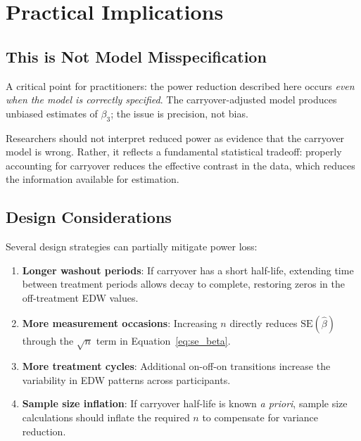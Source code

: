\documentclass[11pt,letterpaper]{article}
\begin{document}
\section{Practical Implications}

\subsection{This is Not Model Misspecification}

A critical point for practitioners: the power reduction described here occurs
\emph{even when the model is correctly specified}. The carryover-adjusted
model produces unbiased estimates of $\beta_3$; the issue is precision, not
bias.

Researchers should not interpret reduced power as evidence that the carryover
model is wrong. Rather, it reflects a fundamental statistical tradeoff:
properly accounting for carryover reduces the effective contrast in the data,
which reduces the information available for estimation.

\subsection{Design Considerations}

Several design strategies can partially mitigate power loss:

\begin{enumerate}
    \item \textbf{Longer washout periods}: If carryover has a short half-life,
          extending time between treatment periods allows decay to complete,
          restoring zeros in the off-treatment EDW values.

    \item \textbf{More measurement occasions}: Increasing $n$ directly reduces
          $\text{SE}(\hat{\beta})$ through the $\sqrt{n}$ term in
          Equation~\ref{eq:se_beta}.

    \item \textbf{More treatment cycles}: Additional on-off-on transitions
          increase the variability in EDW patterns across participants.

    \item \textbf{Sample size inflation}: If carryover half-life is known
          \emph{a priori}, sample size calculations should inflate the
          required $n$ to compensate for variance reduction.
\end{enumerate}
\end{document}

